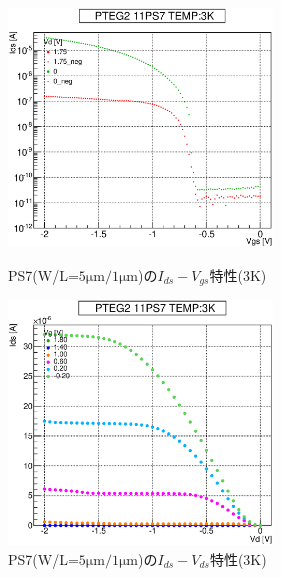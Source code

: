 				\begin{figure}[htbp]
					\begin{minipage}{0.5\hsize}
						\begin{center}
							\includegraphics[width=70mm]{./Chapter/Appendix/Picture/PST/PS7/PTEG2_11_PS7_IdVg_3K.eps}
						\end{center}
						\caption{PS7(W/L=$5\mathrm{\mu m}/1\mathrm{\mu m}$)の$I_{ds}-V_{gs}$特性(3K)}
						\label{fig:PS7_IdVg_3K}
					\end{minipage}
					\begin{minipage}{0.5\hsize}
						\begin{center}
							\includegraphics[width=70mm]{./Chapter/Appendix/Picture/PST/PS7/PTEG2_11_PS7_IdVd_3K.eps}
						\end{center}
						\caption{PS7(W/L=$5\mathrm{\mu m}/1\mathrm{\mu m}$)の$I_{ds}-V_{ds}$特性(3K)}
						\label{fig:PS7_IdVd_3K}
					\end{minipage}
				\end{figure}
